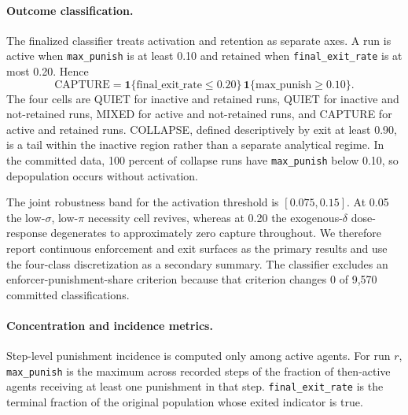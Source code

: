 \documentclass[12pt]{article}
\begin{document}
\paragraph{Outcome classification.} The finalized classifier treats activation
and retention as separate axes. A run is active when \texttt{max\_punish} is at
least 0.10 and retained when \texttt{final\_exit\_rate} is at most 0.20. Hence
\begin{equation}
 \mathrm{CAPTURE}=\mathbf{1}\{\mathrm{final\_exit\_rate}\leq0.20\}\,\mathbf{1}\{\mathrm{max\_punish}\geq0.10\}.
\end{equation}
The four cells are QUIET for inactive and retained runs, QUIET for inactive and
not-retained runs, MIXED for active and not-retained runs, and CAPTURE for
active and retained runs. COLLAPSE, defined descriptively by exit at least 0.90,
is a tail within the inactive region rather than a separate analytical regime.
In the committed data, 100 percent of collapse runs have \texttt{max\_punish}
below 0.10, so depopulation occurs without activation.

The joint robustness band for the activation threshold is \([0.075,0.15]\). At
0.05 the low-\(\sigma\), low-\(\pi\) necessity cell revives, whereas at 0.20 the
exogenous-\(\delta\) dose-response degenerates to approximately zero capture
throughout. We therefore report continuous enforcement and exit surfaces as the
primary results and use the four-class discretization as a secondary summary.
The classifier excludes an enforcer-punishment-share criterion because that
criterion changes 0 of 9,570 committed classifications.

\paragraph{Concentration and incidence metrics.} Step-level punishment incidence
is computed only among active agents. For run \(r\), \texttt{max\_punish} is the
maximum across recorded steps of the fraction of then-active agents receiving at
least one punishment in that step. \texttt{final\_exit\_rate} is the terminal
fraction of the original population whose exited indicator is true.
\end{document}
